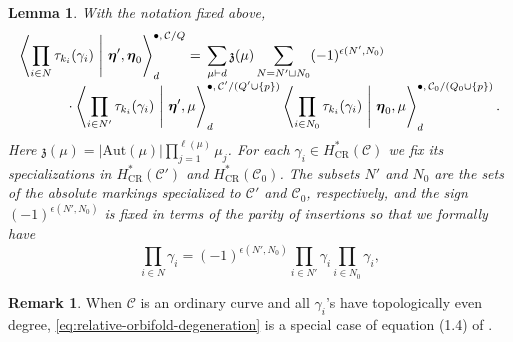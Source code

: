 \documentclass[letterpaper,12pt]{amsart}
\newtheorem{lem}[thm]{Lemma}
\theoremstyle{definition}
\newtheorem{rmk}[thm]{Remark}
\newcommand{\cC}{\mathcal C}
\newcommand{\CR}{\mathrm{CR}}
\newcommand{\Aut}{\mathrm{Aut}}
\numberwithin{equation}{section}
\begin{document}
\begin{lem}
\label{lem:relative-orbifold-degeneration}
With the notation fixed above,
\begin{equation}
\label{eq:relative-orbifold-degeneration}
\begin{aligned}
\left\langle
\prod_{i\in N}\tau_{k_i}(\gamma_i)
\ \middle|\
\boldsymbol\eta',\boldsymbol\eta_0
\right\rangle^{\bullet,\,\cC/Q}_{d}
={}&
\sum_{\mu\vdash d}\mathfrak z(\mu)
\sum_{N=N'\sqcup N_0}(-1)^{\epsilon(N',N_0)}
\\[-1mm]
&\hspace{-35mm}\cdot
\left\langle
\prod_{i\in N'}\tau_{k_i}(\gamma_i)
\ \middle|\
\boldsymbol\eta',\mu
\right\rangle^{\bullet,\,\cC'/(Q'\cup\{p\})}_{d}
\left\langle
\prod_{i\in N_0}\tau_{k_i}(\gamma_{i})
\ \middle|\
\boldsymbol\eta_0,\mu
\right\rangle^{\bullet,\,\cC_0/(Q_0\cup\{p\})}_{d}.
\end{aligned}
\end{equation}
Here \(
\mathfrak z(\mu)
=
|\Aut(\mu)|
\prod_{j=1}^{\ell(\mu)}\mu_j
\). For each $\gamma_i\in H^*_{\CR}(\cC)$ we fix its specializations in $H^*_{\CR}(\cC')$ and $H^*_{\CR}(\cC_0)$. The subsets \(N'\) and \(N_0\) are the sets of the absolute markings
specialized to \(\cC'\) and \(\cC_0\), respectively, and the sign \((-1)^{\epsilon(N',N_0)}\) is fixed in terms of the parity of insertions so that we formally have \[\prod_{i\in N}\gamma_i=(-1)^{\epsilon(N',N_0)}\prod_{i\in N'}\gamma_i\prod_{i\in N_0}\gamma_i,\]
\end{lem}
\begin{rmk}
When $\cC$ is an ordinary curve and all $\gamma_i$'s have topologically even degree, \eqref{eq:relative-orbifold-degeneration} is a special case of equation (1.4) of \cite{OP3}.
\end{rmk}
\end{document}
